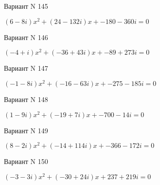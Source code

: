 \documentclass[11pt]{report}
\begin{document}
Вариант N 145

$(6 - 8 i)x^2 + (24 - 132 i)x + -180 - 360 i = 0$

Вариант N 146

$(-4 + i)x^2 + (-36 + 43 i)x + -89 + 273 i = 0$

Вариант N 147

$(-1 - 8 i)x^2 + (-16 - 63 i)x + -275 - 185 i = 0$

Вариант N 148

$(1 - 9 i)x^2 + (-19 + 7 i)x + -700 - 14 i = 0$

Вариант N 149

$(8 - 2 i)x^2 + (-14 + 114 i)x + -366 - 172 i = 0$

Вариант N 150

$(-3 - 3 i)x^2 + (-30 + 24 i)x + 237 + 219 i = 0$
\end{document}

